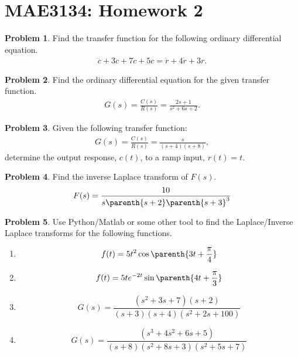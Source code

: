 \documentclass[10pt]{article}
\date{}
\theoremstyle{definition}
\newtheorem{prob}{Problem}[section]
\newenvironment{subprob}%
{\renewcommand{\theenumi}{\alph{enumi}}\renewcommand{\labelenumi}{(\theenumi)}\begin{enumerate}}%
{\end{enumerate}}%
\begin{document}
\pagestyle{empty}
\section*{MAE3134: Homework 2}
\vspace*{-0.4cm}


\begin{prob}
    Find the transfer function for the following ordinary differential equation.
    \begin{align*}
        \dddot{c} + 3 \ddot{c} + 7 \dot{c} + 5 c = \ddot{r} + 4 \dot{r} + 3 r.
    \end{align*}
\end{prob}

\begin{prob}
    Find the ordinary differential equation for the given transfer function.
    \begin{align*}
        G(s) = \frac{C(s)}{R(s)} = \frac{2 s + 1}{s^2 + 6s + 2}.
    \end{align*}
\end{prob}

\begin{prob}
    Given the following transfer function:
    \begin{align*}
        G(s) = \frac{C(s)}{R(s)} = \frac{s}{(s +4)(s+8)} ,
    \end{align*}
    determine the output response, \( c(t) \), to a ramp input, \( r(t) = t \).
\end{prob}

\begin{prob}
    Find the inverse Laplace transform of \( F(s)\).
    \begin{align*}
        F(s) = \frac{10}{s \parenth{s+2}\parenth{s+3}^3}
    \end{align*}
\end{prob}
\begin{prob}
    Use Python/Matlab or some other tool to find the Laplace/Inverse Laplace transforms for the following functions.

    \begin{subprob}
        \item \[ f(t) = 5 t^2 \cos \parenth{3 t + \frac{\pi}{4}} \]
        \item \[ f(t) = 5 t e^{-2t} \sin \parenth{4t + \frac{\pi}{3}}\]
        \item \[ G(s) = \frac{(s^2+3s+7)(s+2)}{(s+3)(s+4)(s^2+2s+100)}\]
        \item \[ G(s) = \frac{(s^3 + 4s^2 + 6s +5)}{(s+8)(s^2 + 8s+3)(s^2 + 5s+7)}\]
    \end{subprob}
\end{prob}
\end{document}
